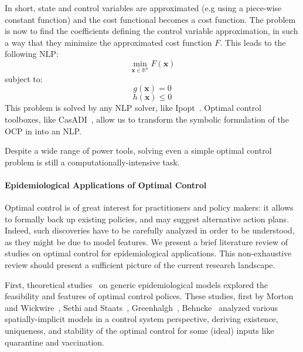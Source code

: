 In short, state and control variables are approximated (e.g using a piece-wise constant function) and the cost functional becomes a cost function. The problem is now to find the coefficients defining the control variable approximation, in such a way that they minimize the approximated cost function $F$. This leads to the following NLP:
\begin{equation}
\min_{\textbf{x} \in \mathbb{R}^n} F(\textbf{x})
\end{equation}
subject to:
\begin{equation}
g(\textbf{x}) = 0
\end{equation}    
\begin{equation}
h(\textbf{x}) \leq 0
\end{equation}
This problem is solved by any NLP solver, like Ipopt~\cite{wachter_implementation_2006}.   Optimal control toolboxes, like CasADI~\cite{andersson_casadi:_2012}, allow us to transform the symbolic formulation of the OCP in into an NLP. 

Despite a wide range of power tools, solving even a simple  optimal control problem is still a computationally-intensive task.

\paragraph{Epidemiological Applications of Optimal Control}

Optimal control is of great interest for practitioners and policy makers: it allows to formally back up existing policies, and may suggest alternative action plans. Indeed, such discoveries have to be carefully analyzed in order to be understood, as they might be due to model features. We present a brief literature review of studies on optimal control for epidemiological applications. This non-exhaustive review should present a sufficient picture of the current research landscape.

First, theoretical studies~\cite{kar_stability_2011, laguzet_global_2015} on  generic epidemiological models explored the feasibility and features of optimal control polices. These studies, first by Morton and Wickwire~\cite{morton_optimal_1974}, Sethi and Staats~\cite{sethi_optimal_1978}, Greenhalgh~\cite{greenhalgh_results_1988}, Behncke~\cite{behncke_optimal_2001} analyzed  various spatially-implicit models in a control system perspective, deriving existence, uniqueness, and stability of the optimal control for some (ideal) inputs like quarantine and vaccination.

